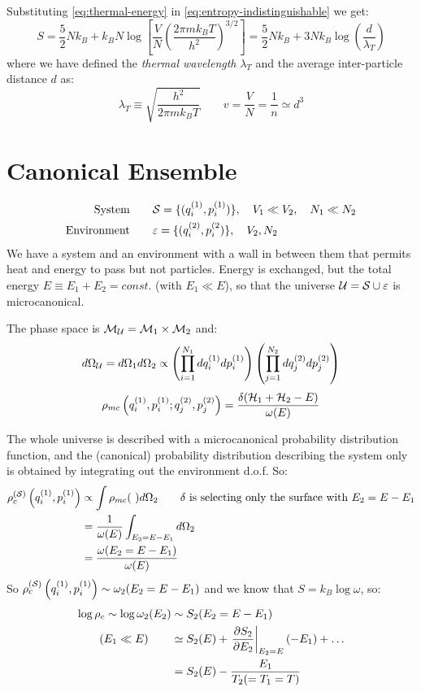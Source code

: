 Substituting \ref{eq:thermal-energy} in \ref{eq:entropy-indistinguishable} we get:
$$ S = \frac 52 Nk_B + k_B N\log \left[\frac VN\left(\frac{2\pi m k_B T}{h^2}\right)^{3/2}\right] = \frac 52 N k_B + 3 Nk_B \log \left(\frac d{\lambda_T}\right)$$
where we have defined the \textit{thermal wavelength} $\lambda_T$ and the average inter-particle distance $d$ as:
$$ \lambda_T \equiv \sqrt{\frac{h^2}{2\pi m k_BT}} \qquad v = \frac VN = \frac 1n \simeq d^3$$


\section{Canonical Ensemble}
\begin{align*}
    \text{System} \qquad & \mathcal{S} = \{(q_i^{(1)}, p_i^{(1)})\},\quad  V_1 \ll V_2, \quad N_1 \ll N_2 \\
    \text{Environment} \qquad & \varepsilon = \{(q_i^{(2)}, p_i^{(2})\}, \quad V_2, N_2
\end{align*}
We have a system and an environment with a wall in between them that permits heat and energy to pass but not particles. Energy is exchanged, but the total energy $E \equiv E_1 + E_2 = const.$ (with $E_1 \ll E$), so that the universe $\mathcal{U} = \mathcal{S} \cup \varepsilon$ is microcanonical.

The phase space is $\mathcal{M}_{\mathcal{U}} = \mathcal{M}_1 \times \mathcal{M}_2$ and:
$$ d\Omega_{\mathcal{U}} = d\Omega_1 d\Omega_2 \propto \left(\prod_{i=1}^{N_1} dq_i^{(1)}dp_i^{(1)}\right)\left(\prod_{j=1}^{N_2} dq_j^{(2)}dp_j^{(2)}\right)$$
$$ \rho_{mc}\left(q_i^{(1)}, p_i^{(1)};q_j^{(2)},p_j^{(2)}\right) = \frac{\delta(\mathcal{H}_1 + \mathcal{H}_2 - E)}{\omega(E)}$$

The whole universe is described with a microcanonical probability distribution function, and the (canonical) probability distribution describing the system only is obtained by integrating out the environment d.o.f. So:
\begin{align*}
 \rho_c^{(\mathcal{S})}\left(q_i^{(1)},p_i^{(1)}\right) &\propto \int \rho_{mc}(\ ) d\Omega_2 \qquad \delta\text{ is selecting only the surface with $E_2 = E-E_1$} \\
 &= \frac 1{\omega(E)} \int_{E_2=E-E_1}d\Omega_2 \\
 &= \frac{\omega(E_2 = E-E_1)}{\omega(E)}
\end{align*}
So $\rho_c^{(\mathcal{S})}\left(q_i^{(1)},p_i^{(1)}\right) \sim \omega_2(E_2 = E-E_1)$ and we know that $S = k_B \log \omega$, so:
\begin{align*}
\log \rho_c \sim \log \omega_2(E_2) &\sim S_2(E_2=E-E_1) \\
(E_1 \ll E) \qquad &\simeq S_2(E) + \left.\frac{\partial S_2}{\partial E_2}\right|_{E_2=E} (-E_1) + \dots \\
&= S_2(E) - \frac{E_1}{T_2(=T_1=T)}
\end{align*}

